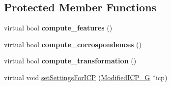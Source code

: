 \subsection*{Protected Member Functions}
\begin{DoxyCompactItemize}
\item 
\hypertarget{classRegistration__ICP_a656bded6e531c0ed9e23a0851d0c97dc}{
virtual bool {\bfseries compute\_\-features} ()}
\label{classRegistration__ICP_a656bded6e531c0ed9e23a0851d0c97dc}

\item 
\hypertarget{classRegistration__ICP_aa375b4ac4304c0055fa15452046f77a3}{
virtual bool {\bfseries compute\_\-corrospondences} ()}
\label{classRegistration__ICP_aa375b4ac4304c0055fa15452046f77a3}

\item 
\hypertarget{classRegistration__ICP_ad016a9ee4ae532da959c397e6990d2fd}{
virtual bool {\bfseries compute\_\-transformation} ()}
\label{classRegistration__ICP_ad016a9ee4ae532da959c397e6990d2fd}

\item 
virtual void \hyperlink{classRegistration__ICP_a3217a0d69daa6726a5c8049600b9607a}{setSettingsForICP} (\hyperlink{classModifiedICP__G}{ModifiedICP\_\-G} $\ast$icp)
\end{DoxyCompactItemize}
